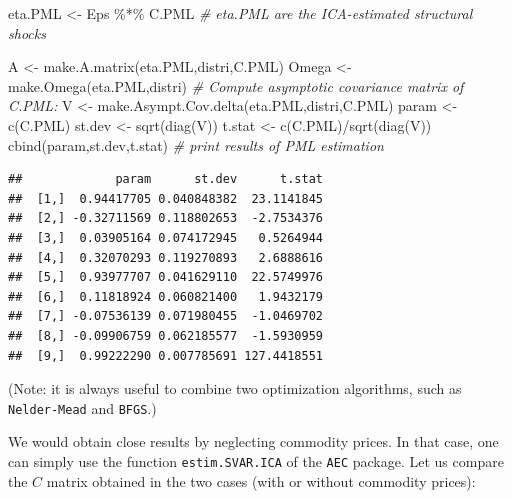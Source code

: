 \documentclass[
  12pt,
]{book}
\newenvironment{Shaded}{\begin{snugshade}}{\end{snugshade}}
\newcommand{\AttributeTok}[1]{\textcolor[rgb]{0.77,0.63,0.00}{#1}}
\newcommand{\CommentTok}[1]{\textcolor[rgb]{0.56,0.35,0.01}{\textit{#1}}}
\newcommand{\ConstantTok}[1]{\textcolor[rgb]{0.00,0.00,0.00}{#1}}
\newcommand{\DecValTok}[1]{\textcolor[rgb]{0.00,0.00,0.81}{#1}}
\newcommand{\FunctionTok}[1]{\textcolor[rgb]{0.00,0.00,0.00}{#1}}
\newcommand{\NormalTok}[1]{#1}
\newcommand{\OtherTok}[1]{\textcolor[rgb]{0.56,0.35,0.01}{#1}}
\newcommand{\SpecialCharTok}[1]{\textcolor[rgb]{0.00,0.00,0.00}{#1}}
\theoremstyle{definition}
\theoremstyle{definition}
\theoremstyle{definition}
\theoremstyle{definition}
\theoremstyle{remark}
\begin{document}
\begin{Shaded}
\begin{Highlighting}[]
\NormalTok{eta.PML }\OtherTok{\textless{}{-}}\NormalTok{ Eps }\SpecialCharTok{\%*\%}\NormalTok{ C.PML }\CommentTok{\# eta.PML are the ICA{-}estimated structural shocks}

\NormalTok{A }\OtherTok{\textless{}{-}} \FunctionTok{make.A.matrix}\NormalTok{(eta.PML,distri,C.PML)}
\NormalTok{Omega }\OtherTok{\textless{}{-}} \FunctionTok{make.Omega}\NormalTok{(eta.PML,distri)}
\CommentTok{\# Compute asymptotic covariance matrix of C.PML:}
\NormalTok{V }\OtherTok{\textless{}{-}} \FunctionTok{make.Asympt.Cov.delta}\NormalTok{(eta.PML,distri,C.PML)}
\NormalTok{param }\OtherTok{\textless{}{-}} \FunctionTok{c}\NormalTok{(C.PML)}
\NormalTok{st.dev }\OtherTok{\textless{}{-}} \FunctionTok{sqrt}\NormalTok{(}\FunctionTok{diag}\NormalTok{(V))}
\NormalTok{t.stat }\OtherTok{\textless{}{-}} \FunctionTok{c}\NormalTok{(C.PML)}\SpecialCharTok{/}\FunctionTok{sqrt}\NormalTok{(}\FunctionTok{diag}\NormalTok{(V))}
\FunctionTok{cbind}\NormalTok{(param,st.dev,t.stat) }\CommentTok{\# print results of PML estimation}
\end{Highlighting}
\end{Shaded}

\begin{verbatim}
##             param      st.dev      t.stat
##  [1,]  0.94417705 0.040848382  23.1141845
##  [2,] -0.32711569 0.118802653  -2.7534376
##  [3,]  0.03905164 0.074172945   0.5264944
##  [4,]  0.32070293 0.119270893   2.6888616
##  [5,]  0.93977707 0.041629110  22.5749976
##  [6,]  0.11818924 0.060821400   1.9432179
##  [7,] -0.07536139 0.071980455  -1.0469702
##  [8,] -0.09906759 0.062185577  -1.5930959
##  [9,]  0.99222290 0.007785691 127.4418551
\end{verbatim}

(Note: it is always useful to combine two optimization algorithms, such as \texttt{Nelder-Mead} and \texttt{BFGS}.)

We would obtain close results by neglecting commodity prices. In that case, one can simply use the function \texttt{estim.SVAR.ICA} of the \texttt{AEC} package. Let us compare the \(C\) matrix obtained in the two cases (with or without commodity prices):

\begin{Shaded}
\end{Shaded}
\end{document}
